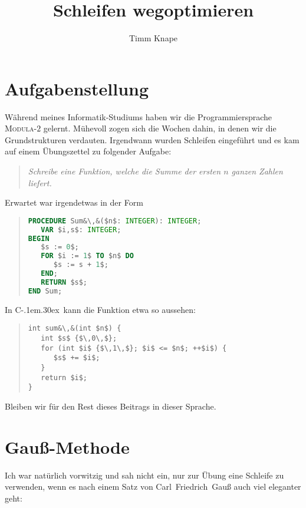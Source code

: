 \documentclass[a5paper,landscape,ngerman,10pt]{article}
\title{Schleifen wegoptimieren}
\author{Timm Knape}
\begin{document}
\newcommand{\cpp}{C\kern-.1em\raise.30ex\hbox{\smaller{++}}}
\lstset{
  columns=fullflexible,
  language=[11]C++,
  mathescape=true,
  escapechar=\&
}
%
\maketitle
%
\section{Aufgabenstellung}
%
Während meines Informatik-Studiums haben wir die
Programmiersprache \hbox{\textsc{Modula-$2$}} gelernt.
Mühevoll zogen sich die Wochen dahin, in denen wir die
Grundstrukturen verdauten.
Irgendwann wurden Schleifen eingeführt und es kam auf
einem Übungszettel zu folgender Aufgabe:

\begin{quotation}
\textit{Schreibe eine Funktion, welche die 
Summe der ersten $n$ ganzen Zahlen liefert.}
\end{quotation}

Erwartet war irgendetwas in der Form

\begin{quotation}
\begin{lstlisting}[language=Modula-2, morekeywords={TO}]
PROCEDURE Sum&\,&($n$: INTEGER): INTEGER;
   VAR $i,s$: INTEGER;
BEGIN
   $s := 0$;
   FOR $i := 1$ TO $n$ DO
      $s := s + 1$;
   END;
   RETURN $s$;
END Sum;
\end{lstlisting}
\end{quotation}

In \cpp\ kann die Funktion etwa so aussehen:

\begin{quotation}
\begin{lstlisting}
int sum&\,&(int $n$) {
   int $s$ {$\,0\,$};
   for (int $i$ {$\,1\,$}; $i$ <= $n$; ++$i$) {
      $s$ += $i$;
   }
   return $i$;
}
\end{lstlisting}
\end{quotation}

Bleiben wir für den Rest dieses Beitrags in dieser Sprache.

\section{Gauß-Methode}

Ich war natürlich vorwitzig und sah nicht ein,
nur zur Übung eine Schleife zu verwenden,
wenn es nach einem Satz von 
Carl~Friedrich~Gauß auch viel eleganter geht:
\end{document}
